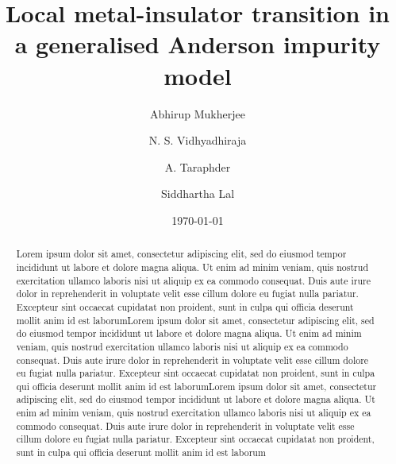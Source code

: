 \documentclass[reprint,superscriptaddress,floatfix]{revtex4-2}
\begin{document}
\title{Local metal-insulator transition in a generalised Anderson impurity model}
\author{Abhirup Mukherjee}
\author{N. S. Vidhyadhiraja}
\author{A. Taraphder}
\author{Siddhartha Lal}

\date{\today}

\begin{abstract}
Lorem ipsum dolor sit amet, consectetur adipiscing elit, sed do eiusmod tempor incididunt ut labore et dolore magna aliqua. Ut enim ad minim veniam, quis nostrud exercitation ullamco laboris nisi ut aliquip ex ea commodo consequat. Duis aute irure dolor in reprehenderit in voluptate velit esse cillum dolore eu fugiat nulla pariatur. Excepteur sint occaecat cupidatat non proident, sunt in culpa qui officia deserunt mollit anim id est laborumLorem ipsum dolor sit amet, consectetur adipiscing elit, sed do eiusmod tempor incididunt ut labore et dolore magna aliqua. Ut enim ad minim veniam, quis nostrud exercitation ullamco laboris nisi ut aliquip ex ea commodo consequat. Duis aute irure dolor in reprehenderit in voluptate velit esse cillum dolore eu fugiat nulla pariatur. Excepteur sint occaecat cupidatat non proident, sunt in culpa qui officia deserunt mollit anim id est laborumLorem ipsum dolor sit amet, consectetur adipiscing elit, sed do eiusmod tempor incididunt ut labore et dolore magna aliqua. Ut enim ad minim veniam, quis nostrud exercitation ullamco laboris nisi ut aliquip ex ea commodo consequat. Duis aute irure dolor in reprehenderit in voluptate velit esse cillum dolore eu fugiat nulla pariatur. Excepteur sint occaecat cupidatat non proident, sunt in culpa qui officia deserunt mollit anim id est laborum
\end{abstract}

\maketitle

\end{document}
